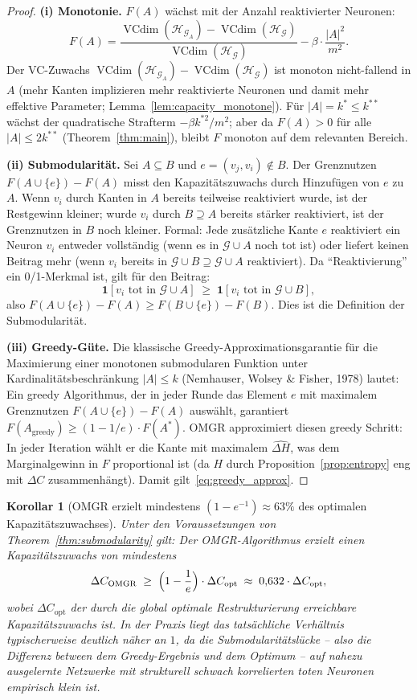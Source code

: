 ﻿\documentclass[12pt, a4paper, openany]{report}
\newtheorem{corollary}[theorem]{Korollar}
\newcommand{\calG}{\mathcal{G}}
\newcommand{\calH}{\mathcal{H}}
\DeclareMathOperator{\VC}{VCdim}
\begin{document}
\begin{proof}
\textbf{(i) Monotonie.}
$F(A)$ wächst mit der Anzahl reaktivierter Neuronen:
\[
  F(A) = \frac{\VC(\calH_{\calG_A}) - \VC(\calH_\calG)}{\VC(\calH_\calG)} - \beta\cdot\frac{|A|^2}{m^2}.
\]
Der VC-Zuwachs $\VC(\calH_{\calG_A}) - \VC(\calH_\calG)$ ist monoton
nicht-fallend in $A$ (mehr Kanten implizieren mehr reaktivierte Neuronen
und damit mehr effektive Parameter; Lemma~\ref{lem:capacity_monotone}).
Für $|A| = k^* \leq k^{**}$ wächst der quadratische Strafterm $-\beta k^{*2}/m^2$;
aber da $F(A) > 0$ für alle $|A| \leq 2k^{**}$ (Theorem~\ref{thm:main}),
bleibt $F$ monoton auf dem relevanten Bereich.

\textbf{(ii) Submodularität.}
Sei $A \subseteq B$ und $e = (v_j, v_i) \notin B$.  Der Grenznutzen
$F(A \cup \{e\}) - F(A)$ misst den Kapazitätszuwachs durch Hinzufügen
von $e$ zu $A$.  Wenn $v_i$ durch Kanten in $A$ bereits teilweise
reaktiviert wurde, ist der Restgewinn kleiner; wurde $v_i$ durch $B \supseteq A$
bereits stärker reaktiviert, ist der Grenznutzen in $B$ noch kleiner.
Formal: Jede zusätzliche Kante $e$ reaktiviert ein Neuron $v_i$ entweder
vollständig (wenn es in $\calG \cup A$ noch tot ist) oder liefert keinen
Beitrag mehr (wenn $v_i$ bereits in $\calG \cup B \supseteq \calG \cup A$ reaktiviert).
Da ``Reaktivierung'' ein 0/1-Merkmal ist, gilt für den Beitrag:
\[
  \mathbf{1}[v_i \text{ tot in } \calG \cup A]
  \;\geq\;
  \mathbf{1}[v_i \text{ tot in } \calG \cup B],
\]
also $F(A \cup \{e\}) - F(A) \geq F(B \cup \{e\}) - F(B)$. Dies ist die
Definition der Submodularität.

\textbf{(iii) Greedy-Güte.}
Die klassische Greedy-Approximationsgarantie für die Maximierung einer
monotonen submodularen Funktion unter Kardinalitätsbeschränkung $|A| \leq k$
(Nemhauser, Wolsey \& Fisher, 1978) lautet:
Ein greedy Algorithmus, der in jeder Runde das Element $e$ mit maximalem
Grenznutzen $F(A \cup \{e\}) - F(A)$ auswählt, garantiert
$F(A_{\mathrm{greedy}}) \geq (1 - 1/e) \cdot F(A^*)$.
OMGR approximiert diesen greedy Schritt:
In jeder Iteration wählt er die Kante mit maximalem $\widehat{\Delta H}$,
was dem Marginalgewinn in $F$ proportional ist (da $H$ durch Proposition~\ref{prop:entropy}
eng mit $\Delta C$ zusammenhängt).  Damit gilt~\eqref{eq:greedy_approx}.
\end{proof}

\begin{corollary}[OMGR erzielt mindestens $(1-e^{-1}) \approx 63\%$ des optimalen Kapazitätszuwachses]
\label{cor:omgr_approx}
Unter den Voraussetzungen von Theorem~\ref{thm:submodularity} gilt:
Der OMGR-Algorithmus erzielt einen Kapazitätszuwachs von mindestens
\[
  \Delta C_{\mathrm{OMGR}}
  \;\geq\;
  \Bigl(1 - \frac{1}{e}\Bigr) \cdot \Delta C_{\mathrm{opt}}
  \;\approx\; 0{,}632 \cdot \Delta C_{\mathrm{opt}},
\]
wobei $\Delta C_{\mathrm{opt}}$ der durch die global optimale Restrukturierung
erreichbare Kapazitätszuwachs ist.  In der Praxis liegt das tatsächliche
Verhältnis typischerweise deutlich näher an $1$, da die Submodularitätslücke
-- also die Differenz between dem Greedy-Ergebnis und dem Optimum -- auf
nahezu ausgelernte Netzwerke mit strukturell schwach korrelierten toten
Neuronen empirisch klein ist.
\end{corollary}
\end{document}
